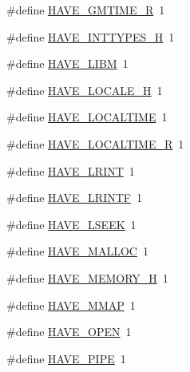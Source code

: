 \begin{DoxyCompactItemize}
\#define \hyperlink{mac_2config_2i386_2lib-src_2libsndfile_2src_2config_8h_a675b25e4a6339ca0cb121ccc9bfbd859}{H\+A\+V\+E\+\_\+\+G\+M\+T\+I\+M\+E\+\_\+R}~1
\item 
\#define \hyperlink{mac_2config_2i386_2lib-src_2libsndfile_2src_2config_8h_ab90a030ff2790ebdc176660a6dd2a478}{H\+A\+V\+E\+\_\+\+I\+N\+T\+T\+Y\+P\+E\+S\+\_\+H}~1
\item 
\#define \hyperlink{mac_2config_2i386_2lib-src_2libsndfile_2src_2config_8h_a822fccccd955b712f62f5ade934e86fc}{H\+A\+V\+E\+\_\+\+L\+I\+BM}~1
\item 
\#define \hyperlink{mac_2config_2i386_2lib-src_2libsndfile_2src_2config_8h_aec3873a23961f50c1d92c8f75a50bd40}{H\+A\+V\+E\+\_\+\+L\+O\+C\+A\+L\+E\+\_\+H}~1
\item 
\#define \hyperlink{mac_2config_2i386_2lib-src_2libsndfile_2src_2config_8h_a04963043b91523ddc4d139c6650547b6}{H\+A\+V\+E\+\_\+\+L\+O\+C\+A\+L\+T\+I\+ME}~1
\item 
\#define \hyperlink{mac_2config_2i386_2lib-src_2libsndfile_2src_2config_8h_a9998e788d1738e06ada9064cea53af2e}{H\+A\+V\+E\+\_\+\+L\+O\+C\+A\+L\+T\+I\+M\+E\+\_\+R}~1
\item 
\#define \hyperlink{mac_2config_2i386_2lib-src_2libsndfile_2src_2config_8h_a2bc3bc313571661387f686459daa7869}{H\+A\+V\+E\+\_\+\+L\+R\+I\+NT}~1
\item 
\#define \hyperlink{mac_2config_2i386_2lib-src_2libsndfile_2src_2config_8h_ae39145bdf6b9b18a6b3c51f3bf4c4d54}{H\+A\+V\+E\+\_\+\+L\+R\+I\+N\+TF}~1
\item 
\#define \hyperlink{mac_2config_2i386_2lib-src_2libsndfile_2src_2config_8h_a331fba800d1ee60aaef971e55c94efd7}{H\+A\+V\+E\+\_\+\+L\+S\+E\+EK}~1
\item 
\#define \hyperlink{mac_2config_2i386_2lib-src_2libsndfile_2src_2config_8h_a14503280ca0cb757db915eea09282bfc}{H\+A\+V\+E\+\_\+\+M\+A\+L\+L\+OC}~1
\item 
\#define \hyperlink{mac_2config_2i386_2lib-src_2libsndfile_2src_2config_8h_ae93a78f9d076138897af441c9f86f285}{H\+A\+V\+E\+\_\+\+M\+E\+M\+O\+R\+Y\+\_\+H}~1
\item 
\#define \hyperlink{mac_2config_2i386_2lib-src_2libsndfile_2src_2config_8h_ac24e9c0562704d17896d14869e748fcc}{H\+A\+V\+E\+\_\+\+M\+M\+AP}~1
\item 
\#define \hyperlink{mac_2config_2i386_2lib-src_2libsndfile_2src_2config_8h_af774525bc701ed09c9ab1bc93827bea0}{H\+A\+V\+E\+\_\+\+O\+P\+EN}~1
\item 
\#define \hyperlink{mac_2config_2i386_2lib-src_2libsndfile_2src_2config_8h_a994277e7708bc6af2b551ce70e1e323a}{H\+A\+V\+E\+\_\+\+P\+I\+PE}~1

\end{DoxyCompactItemize}

